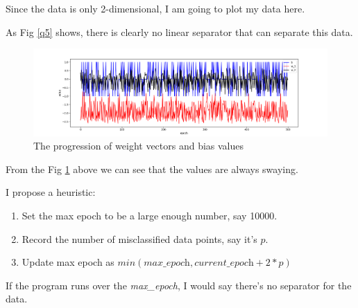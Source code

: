 \documentclass[letter, 12pt]{article}
\begin{document}
\begin{enumerate}
\begin{enumerate}
    	\end{enumerate}
   		\par{Since the data is only 2-dimensional, I am going to plot my data here.}
    	\par{As Fig \ref{q5} shows, there is clearly no linear separator that can separate this data. }
    	\begin{figure}[H]
    		\centering
    		\includegraphics[width=\linewidth]{q5-2.png}
    		\caption{The progression of weight vectors and bias values}
    		\label{q5-2}
    	\end{figure}
    	\par{From the Fig \ref{q5-2} above we can see that the values are always swaying.}
    	\par{I propose a heuristic:}
    	\begin{enumerate}
    		\item {Set the max epoch to be a large enough number, say 10000.}
    		\item {Record the number of misclassified data points, say it's $ p $.}
    		\item {Update max epoch as $ min(\textit{max\_epoch}, \textit{current\_epoch} + 2 * p) $}
    	\end{enumerate}
    	\par{If the program runs over the \textit{max\_epoch}, I would say there's no separator for the data.}
    \end{enumerate}

	{}
	
\end{document}
